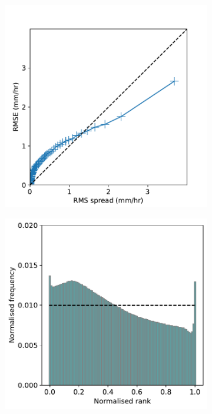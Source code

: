 \documentclass{article}
\begin{document}
\begin{figure}[!ht]
    \centering
    \begin{subfigure}[t]{0.49\textwidth}
     \includegraphics[width=\textwidth]{images/spread_error_final-nologs_217600.pdf}
     \caption{}
     \end{subfigure}
     \centering
    \begin{subfigure}[t]{0.49\textwidth}
     \includegraphics[width=\textwidth]{images/rank_hist_final-nologs_217600.pdf}

\end{subfigure}
\end{figure}
\end{document}
